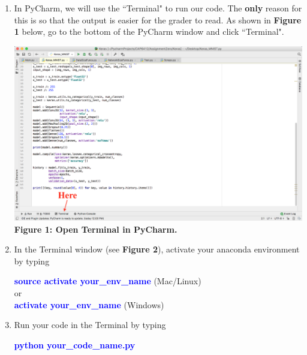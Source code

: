 \documentclass[12pt]{article}
\theoremstyle{plain}
\theoremstyle{definition}
\begin{document}
\begin{enumerate}
\item In PyCharm, we will use the ``Terminal" to run our code. The \textbf{only} reason for this is so that the output is easier for the grader to read. As shown in \textbf{Figure 1} below, go to the bottom of the PyCharm window and click ``Terminal".

\begin{center}
\includegraphics[scale=.25]{run1}\\
\textbf{Figure 1: Open Terminal in PyCharm.}
\end{center}

\item In the Terminal window (see \textbf{Figure 2}), activate your anaconda environment by typing
\vspace{-4mm}
\begin{center}
\textbf{\textcolor{blue}{source activate your\_env\_name}} (Mac/Linux)\\
or\\
\textbf{\textcolor{blue}{activate your\_env\_name}} (Windows)\\
 \end{center} 
\vspace{-4mm}

\item Run your code in the Terminal by typing
\vspace{-4mm}
\begin{center}
\textbf{\textcolor{blue}{python your\_code\_name.py}}
 \end{center} 



\end{enumerate}
\end{document}
